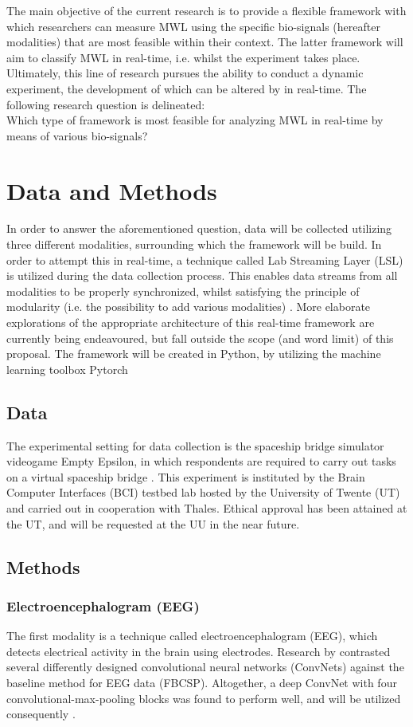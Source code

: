 \documentclass{article}
\begin{document}
The main objective of the current research is to provide a flexible framework with which researchers can measure MWL using the specific bio-signals (hereafter modalities) that are most feasible within their context.  The latter framework will aim to classify MWL in real-time, i.e. whilst the experiment takes place. Ultimately, this line of research pursues the ability to conduct a dynamic experiment, the development of which can be altered by in real-time. The following research question is delineated: \\ 
Which type of framework is most feasible for analyzing MWL in real-time by means of various bio-signals?

\newpage
\section{Data and Methods}
In order to answer the aforementioned question, data will be collected utilizing three different modalities, surrounding which the framework will be build. In order to attempt this in real-time, a technique called Lab Streaming Layer (LSL) is utilized during the data collection process. This enables data streams from all modalities to be properly synchronized, whilst satisfying the principle of modularity (i.e. the possibility to add various modalities) \cite{kothe2018lab}. More elaborate explorations of the appropriate architecture of this real-time framework are currently being endeavoured, but fall outside the scope (and word limit) of this proposal. The framework will be created in Python, by utilizing the machine learning toolbox Pytorch \cite{paszke2017automatic}

\subsection{Data}
The experimental setting for data collection is the spaceship bridge simulator videogame Empty Epsilon, in which respondents are required to carry out tasks on a virtual spaceship bridge \cite{daid2016empty}. This experiment is instituted by the Brain Computer Interfaces (BCI) testbed lab hosted by the University of Twente (UT) and carried out in cooperation with Thales. Ethical approval has been attained at the UT, and will be requested at the UU in the near future.  

\subsection{Methods}
\subsubsection{Electroencephalogram (EEG)}
The first modality is a technique  called electroencephalogram (EEG), which detects electrical activity in the brain using electrodes. Research by \cite{schirrmeister2017deep} contrasted several differently designed convolutional neural networks (ConvNets) against the baseline method for EEG data (FBCSP). Altogether, a deep ConvNet with four convolutional-max-pooling blocks was found to perform well, and will be utilized consequently \cite{schirrmeister2017deep}.  
\end{document}
